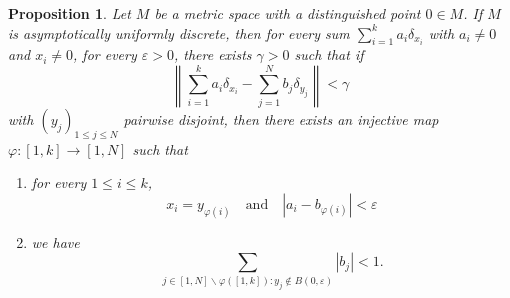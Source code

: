 \documentclass[12pt,english]{amsart}
\numberwithin{equation}{section}
\theoremstyle{plain}
\newtheorem{proposition}[theorem]{Proposition}
\theoremstyle{definition}
\begin{document}
\begin{proposition}\label{gamma}
Let $M$ be a metric space with a distinguished point $0\in M$. If $M$ is asymptotically uniformly discrete, then for every sum $\sum_{i=1}^k a_i \delta_{x_i}$ with $a_i\ne 0$ and $x_i\ne 0$, for every $\varepsilon>0$, there exists $\gamma>0$ such that if 
\[\left\|\sum_{i=1}^k a_i \delta_{x_i}-\sum_{j=1}^N b_j \delta_{y_j}\right\|<\gamma\]
with $(y_j)_{1\le j\le N}$ pairwise disjoint, then there exists an injective map $\varphi\colon [1,k]\to [1,N]$ such that
\begin{enumerate}
\item for every $1\le i\le k$, 
\[x_i=y_{\varphi(i)} \quad \text{and}\quad |a_i-b_{\varphi(i)}|<\varepsilon\]
\item we have 
\[\sum_{j\in [1,N]\backslash \varphi([1,k]):y_j\notin B(0,\varepsilon)}|b_j|<1.\]
\end{enumerate}
\end{proposition}
\end{document}

